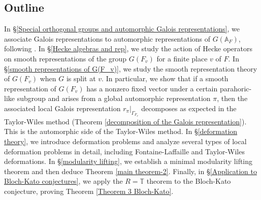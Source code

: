 \documentclass[12pt,oneside,reqno]{amsart}
\theoremstyle{plain}
\begin{document}
	\subsection*{Outline}
	In §\ref{Special orthogonal groups and automorphic Galois representations}, we associate Galois representations to automorphic representations of $G(\mathbb{A}_F)$, following \cite{Arthur2013,Shin2024}.	
	In §\ref{Hecke algebras and rep}, we study the action of Hecke operators on smooth representations of the group $G(F_v)$ for a finite place $v$ of $F$.	
	In §\ref{smooth representations of G(F_v)}, we study the smooth representation theory of $G(F_v)$ when $G$ is split at $v$. In particular, we show that if a smooth representation of $G(F_v)$ has a nonzero fixed vector under a certain parahoric-like subgroup and arises from a global automorphic representation $\pi$, then the associated local Galois representation $r_\pi|_{\Gamma_{F_v}}$ decomposes as expected in the Taylor-Wiles method (Theorem \ref{decomposition of the Galois representation}).	This is the automorphic side of the Taylor-Wiles method.
	In §\ref{deformation theory}, we introduce deformation problems and analyze several types of local deformation problems in detail, including Fontaine-Laffaille and Taylor-Wiles deformations.	
	In §\ref{modularity lifting}, we establish a minimal modularity lifting theorem and then deduce Theorem \ref{main theorem-2}.	
	Finally, in §\ref{Application to Bloch-Kato conjectures}, we apply the $R=\mathbb{T}$ theorem to the Bloch-Kato conjecture, proving Theorem \ref{Theorem 3 Bloch-Kato}.
	
	
	
	
	
	
	
	
	
	
	
	
	
	
	
	
	
	
\end{document}

